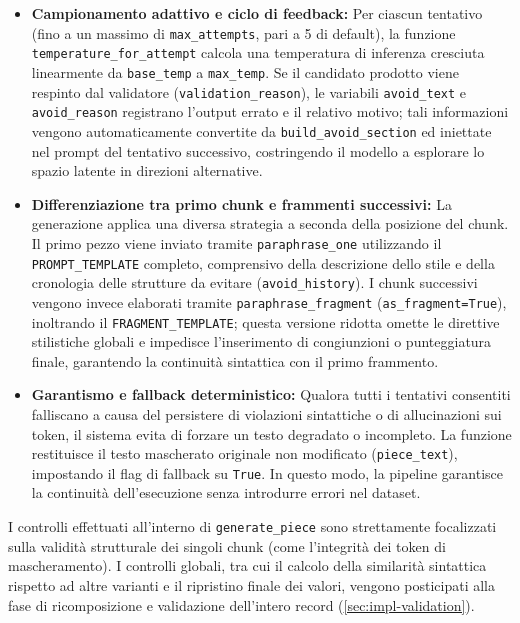 \documentclass[12pt,a4paper,openright,twoside]{book}
\begin{document}
\begin{itemize}
    \item \textbf{Campionamento adattivo e ciclo di feedback:} Per ciascun
          tentativo (fino a un massimo di \texttt{max\_attempts}, pari a 5 di
          default), la funzione \texttt{temperature\_for\_attempt} calcola una
          temperatura di inferenza cresciuta linearmente da \texttt{base\_temp}
          a \texttt{max\_temp}. Se il candidato prodotto viene respinto dal
          validatore (\texttt{validation\_reason}), le variabili
          \texttt{avoid\_text} e \texttt{avoid\_reason} registrano l'output
          errato e il relativo motivo; tali informazioni vengono automaticamente
          convertite da \texttt{build\_avoid\_section} ed iniettate nel prompt
          del tentativo successivo, costringendo il modello a esplorare lo
          spazio latente in direzioni alternative.

    \item \textbf{Differenziazione tra primo chunk e frammenti successivi:} La
          generazione applica una diversa strategia a seconda della posizione
          del chunk. Il primo pezzo viene inviato tramite
          \texttt{paraphrase\_one} utilizzando il \texttt{PROMPT\_TEMPLATE}
          completo, comprensivo della descrizione dello stile e della cronologia
          delle strutture da evitare (\texttt{avoid\_history}). I chunk
          successivi vengono invece elaborati tramite
          \texttt{paraphrase\_fragment} (\texttt{as\_fragment=True}), inoltrando
          il \texttt{FRAGMENT\_TEMPLATE}; questa versione ridotta omette le
          direttive stilistiche globali e impedisce l'inserimento di
          congiunzioni o punteggiatura finale, garantendo la continuità
          sintattica con il primo frammento.

    \item \textbf{Garantismo e fallback deterministico:} Qualora tutti i
          tentativi consentiti falliscano a causa del persistere di violazioni
          sintattiche o di allucinazioni sui token, il sistema evita di forzare
          un testo degradato o incompleto. La funzione restituisce il testo
          mascherato originale non modificato (\texttt{piece\_text}), impostando
          il flag di fallback su \texttt{True}. In questo modo, la pipeline
          garantisce la continuità dell'esecuzione senza introdurre errori nel
          dataset. \end{itemize}

I controlli effettuati all'interno di \texttt{generate\_piece} sono strettamente
focalizzati sulla validità strutturale dei singoli chunk (come l'integrità dei
token di mascheramento). I controlli globali, tra cui il calcolo della
similarità sintattica rispetto ad altre varianti e il ripristino finale dei
valori, vengono posticipati alla fase di ricomposizione e validazione
dell'intero record (\cref{sec:impl-validation}).
\end{document}

